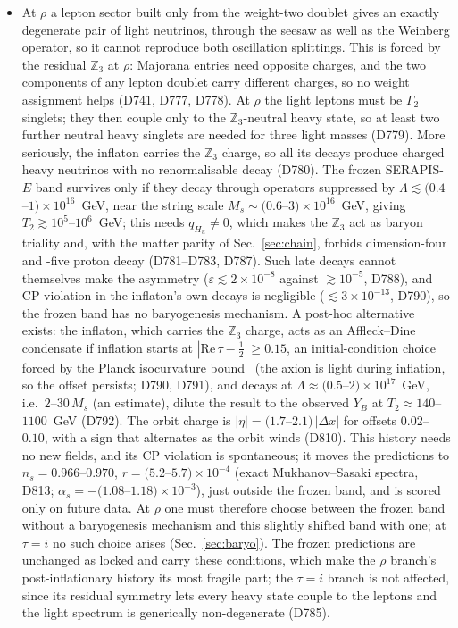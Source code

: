 \documentclass[aps,prd,twocolumn,superscriptaddress,nofootinbib,floatfix]{revtex4-2}
\begin{document}
\begin{itemize}
\item At $\rho$ a lepton sector built only from the weight-two doublet gives an exactly degenerate pair of light neutrinos, through the seesaw as well as the Weinberg operator, so it cannot reproduce both oscillation splittings. This is forced by the residual $\mathbb{Z}_3$ at $\rho$: Majorana entries need opposite charges, and the two components of any lepton doublet carry different charges, so no weight assignment helps (D741, D777, D778). At $\rho$ the light leptons must be $\Gamma_2$ singlets; they then couple only to the $\mathbb{Z}_3$-neutral heavy state, so at least two further neutral heavy singlets are needed for three light masses (D779). More seriously, the inflaton carries the $\mathbb{Z}_3$ charge, so all its decays produce charged heavy neutrinos with no renormalisable decay (D780). The frozen SERAPIS-$E$ band survives only if they decay through operators suppressed by $\Lambda\lesssim(0.4$--$1)\times10^{16}$~GeV, near the string scale $M_s\sim(0.6$--$3)\times10^{16}$~GeV, giving $T_2\gtrsim10^5$--$10^6$~GeV; this needs $q_{H_u}\neq0$, which makes the $\mathbb{Z}_3$ act as baryon triality and, with the matter parity of Sec.~\ref{sec:chain}, forbids dimension-four and -five proton decay (D781--D783, D787). Such late decays cannot themselves make the asymmetry ($\varepsilon\lesssim2\times10^{-8}$ against $\gtrsim10^{-5}$, D788), and CP violation in the inflaton's own decays is negligible ($\lesssim3\times10^{-13}$, D790), so the frozen band has no baryogenesis mechanism. A post-hoc alternative exists: the inflaton, which carries the $\mathbb{Z}_3$ charge, acts as an Affleck--Dine condensate if inflation starts at $|\mathrm{Re}\,\tau-\tfrac12|\ge0.15$, an initial-condition choice forced by the Planck isocurvature bound~\cite{Planck2018X} (the axion is light during inflation, so the offset persists; D790, D791), and decays at $\Lambda\approx(0.5$--$2)\times10^{17}$~GeV, i.e.\ $2$--$30\,M_s$ (an estimate), dilute the result to the observed $Y_B$ at $T_2\approx140$--$1100$~GeV (D792). The orbit charge is $|\eta|=(1.7$--$2.1)\,|\Delta x|$ for offsets $0.02$--$0.10$, with a sign that alternates as the orbit winds (D810). This history needs no new fields, and its CP violation is spontaneous; it moves the predictions to $n_s=0.966$--$0.970$, $r=(5.2$--$5.7)\times10^{-4}$ (exact Mukhanov--Sasaki spectra, D813; $\alpha_s=-(1.08$--$1.18)\times10^{-3}$), just outside the frozen band, and is scored only on future data. At $\rho$ one must therefore choose between the frozen band without a baryogenesis mechanism and this slightly shifted band with one; at $\tau=i$ no such choice arises (Sec.~\ref{sec:baryo}). The frozen predictions are unchanged as locked and carry these conditions, which make the $\rho$ branch's post-inflationary history its most fragile part; the $\tau=i$ branch is not affected, since its residual symmetry lets every heavy state couple to the leptons and the light spectrum is generically non-degenerate (D785).

\end{itemize}
\end{document}
